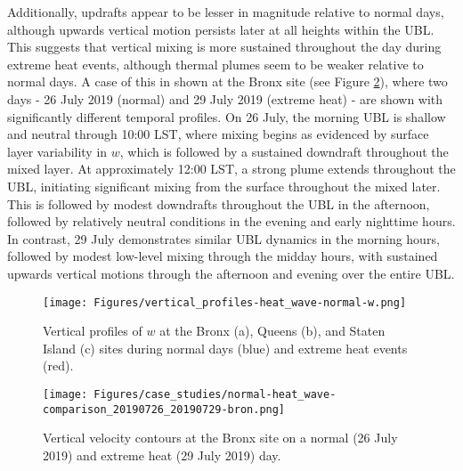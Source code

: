 Additionally, updrafts appear to be lesser in magnitude relative to normal days, although upwards vertical motion persists later at all heights within the UBL. This suggests that vertical mixing is more sustained throughout the day during extreme heat events, although thermal plumes seem to be weaker relative to normal days. A case of this in shown at the Bronx site (see Figure \ref{fig:normal-extreme_heat-w-case_study}), where two days - 26 July 2019 (normal) and 29 July 2019 (extreme heat) - are shown with significantly different temporal profiles. On 26 July, the morning UBL is shallow and neutral through 10:00 LST, where mixing begins as evidenced by surface layer variability in $w$, which is followed by a sustained downdraft throughout the mixed layer. At approximately 12:00 LST, a strong plume extends throughout the UBL, initiating significant mixing from the surface throughout the mixed later. This is followed by modest downdrafts throughout the UBL in the afternoon, followed by relatively neutral conditions in the evening and early nighttime hours. In contrast, 29 July demonstrates similar UBL dynamics in the morning hours, followed by modest low-level mixing through the midday hours, with sustained upwards vertical motions through the afternoon and evening over the entire UBL. 

\begin{figure}[ht]
	\centering
	\texttt{[image: Figures/vertical\_profiles-heat\_wave-normal-w.png]}
	\caption{Vertical profiles of $w$ at the Bronx (a), Queens (b), and Staten Island (c) sites during normal days (blue) and extreme heat events (red).}
	\label{fig:extreme-heat-normal-vertical_profiles-w}
\end{figure}

\begin{figure}[ht]
	\centering
	\texttt{[image: Figures/case\_studies/normal-heat\_wave-comparison\_20190726\_20190729-bron.png]}
	\caption{Vertical velocity contours at the Bronx site on a normal (26 July 2019) and extreme heat (29 July 2019) day.}
	\label{fig:normal-extreme_heat-w-case_study}
\end{figure}

\FloatBarrier

